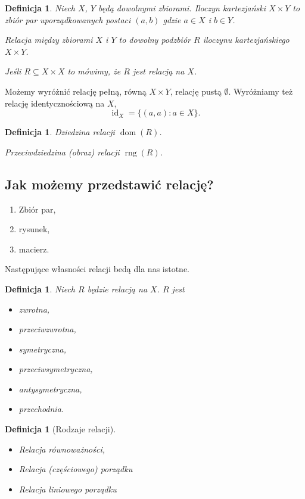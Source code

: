 \documentclass[12pt]{article}
\DeclareMathOperator{\id}{id}
\newtheorem{dfn}[thm]{Definicja}
\DeclareMathOperator{\dom}{dom}
\DeclareMathOperator{\rng}{rng}
\begin{document}
\begin{dfn}
	Niech $X$, $Y$ będą dowolnymi zbiorami. Iloczyn kartezjański $X\times Y$ 
	to zbiór par uporządkowanych postaci $(a,b)$ gdzie $a\in X$ i $b\in Y$.
	
	Relacja między zbiorami $X$ i $Y$ to dowolny podzbiór $R$
	iloczynu kartezjańskiego $X\times Y$.
	
	Jeśli $R\subseteq X\times X$ to mówimy, że $R$ jest relacją na $X$.
\end{dfn}


Możemy wyróżnić relację pełną, równą $X\times Y$, relację pustą $\emptyset$.
Wyróżniamy też relację identycznościową na $X$, 
$$
\id_X= \{(a,a)\colon a\in X\}.
$$ 

\begin{dfn}
	Dziedzina relacji $\dom(R)$.
	
	Przeciwdziedzina (obraz) relacji $\rng(R)$.
\end{dfn}

\subsection{Jak możemy przedstawić relację?}

\begin{enumerate}
	\item Zbiór par,
	\item rysunek,
	\item macierz.
\end{enumerate}

Następujące własności relacji bedą dla nas istotne.

\begin{dfn}
Niech $R$ będzie relacją na $X$. $R$ jest 
\begin{itemize}
	\item zwrotna,
	\item przeciwzwrotna,
	\item symetryczna,
	\item przeciwsymetryczna,
	\item antysymetryczna,
	\item przechodnia.
\end{itemize}	
\end{dfn}

\begin{dfn}[Rodzaje relacji]
	\begin{itemize}
		\item Relacja równoważności,
		\item Relacja (częściowego) porządku
		\item Relacja liniowego porządku
	\end{itemize}
\end{dfn}
\end{document}
